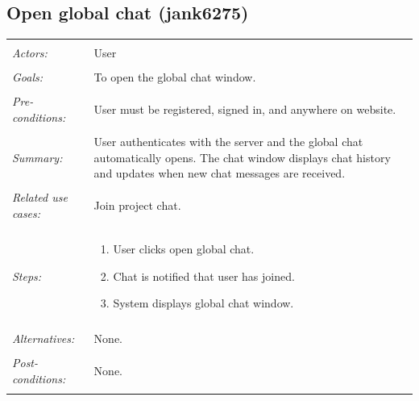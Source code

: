 \documentclass[11pt]{report}
\begin{document}
\subsection{Open global chat (jank6275)}
\begin{tabular}{ p{2cm} p{12cm} }
 \hline
 \\
 \textit{Actors:} & User \\ 
 \\
 \textit{Goals:} & To open the global chat window. \\
 \\
 \textit{Pre-conditions:} & User must be registered, signed in, and anywhere on website.  \\
 \\
 \textit{Summary:} & User authenticates with the server and the global chat automatically opens. The chat window displays chat history and updates when new chat messages are received.  \\ 
 \\
 \textit{Related use cases:} & Join project chat. \\ 
 \\
 \textit{Steps:} & \begin{enumerate}
  \item User clicks open global chat.
  \item Chat is notified that user has joined.
  \item System displays global chat window.
 \end{enumerate} \\
 \\
 \textit{Alternatives:} & None. \\
 \\
 \textit{Post-conditions:} & None. \\
 \\
\hline
\end{tabular}
\end{document}
